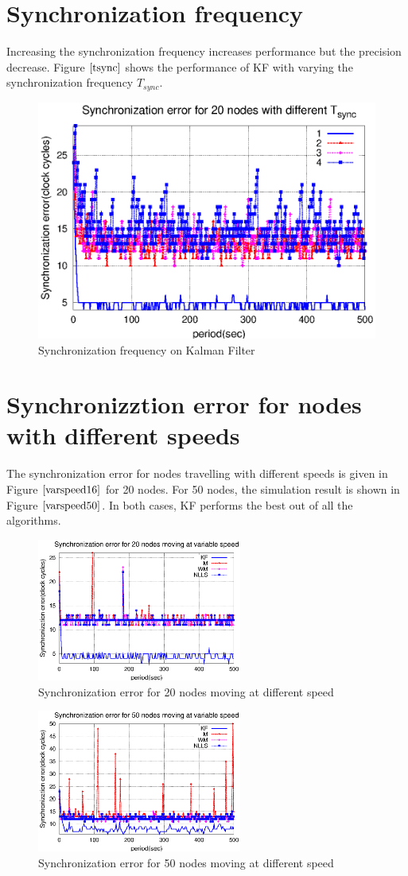 \documentclass[a4paper,10pt]{report}
\begin{document}
\section{Synchronization frequency}
Increasing the synchronization frequency increases performance but
the precision decrease. Figure $\ref{tsync}$ shows the performance
of KF with varying the synchronization frequency $T_{sync}$.
\begin{figure}[!h]
\centering
\includegraphics[width= 0.7 \textwidth]{tsync}
\caption{Synchronization frequency on Kalman Filter} \label{tsync}
\end{figure}
\section{Synchronizztion error for nodes with different speeds}
The synchronization error for nodes travelling with different speeds is given in Figure $\ref{varspeed16}$ for 20 nodes. For 50 nodes, the simulation result is shown in Figure $\ref{varspeed50}$. In both cases, KF performs the best out of all the algorithms.
\begin{figure}
 \centering
 \includegraphics[width=0.6\textwidth]{varspeed20}
 \caption{Synchronization error for 20 nodes moving at different speed}
 \label{varspeed16}
\end{figure}
\begin{figure}
 \centering
 \includegraphics[width=0.6\textwidth]{varspeed50}
 \caption{Synchronization error for 50 nodes moving at different speed}
 \label{varspeed50}
\end{figure}
\end{document}
